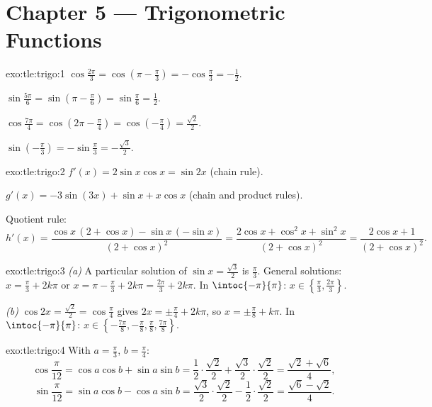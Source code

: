 \section*{Chapter 5 --- Trigonometric Functions}

\begin{solution}{exo:tle:trigo:1}
$\cos\frac{2\pi}{3} = \cos\left(\pi - \frac\pi3\right) = -\cos\frac\pi3
= -\frac12$.

$\sin\frac{5\pi}{6} = \sin\left(\pi - \frac\pi6\right) = \sin\frac\pi6
= \frac12$.

$\cos\frac{7\pi}{4} = \cos\left(2\pi - \frac{\pi}{4}\right)
= \cos\left(-\frac\pi4\right) = \frac{\sqrt2}{2}$.

$\sin\left(-\frac\pi3\right) = -\sin\frac\pi3 = -\frac{\sqrt3}{2}$.
\end{solution}

\begin{solution}{exo:tle:trigo:2}
$f'(x) = 2\sin x\cos x = \sin 2x$ (chain rule).

$g'(x) = -3\sin(3x) + \sin x + x\cos x$ (chain and product rules).

Quotient rule:
\[
h'(x) = \frac{\cos x\,(2 + \cos x) - \sin x\,(-\sin x)}{(2+\cos x)^2}
= \frac{2\cos x + \cos^2 x + \sin^2 x}{(2+\cos x)^2}
= \frac{2\cos x + 1}{(2+\cos x)^2}.
\]
\end{solution}

\begin{solution}{exo:tle:trigo:3}
\emph{(a)} A particular solution of $\sin x = \frac{\sqrt3}{2}$ is
$\frac\pi3$. General solutions: $x = \frac\pi3 + 2k\pi$ or
$x = \pi - \frac\pi3 + 2k\pi = \frac{2\pi}{3} + 2k\pi$. In
$\intoc{-\pi}{\pi}$: $x \in \left\{\frac\pi3, \frac{2\pi}{3}\right\}$.

\emph{(b)} $\cos 2x = \frac{\sqrt2}{2} = \cos\frac\pi4$ gives
$2x = \pm\frac\pi4 + 2k\pi$, so $x = \pm\frac\pi8 + k\pi$. In
$\intoc{-\pi}{\pi}$:
$x \in \left\{-\frac{7\pi}{8}, -\frac\pi8, \frac\pi8, \frac{7\pi}{8}\right\}$.
\end{solution}

\begin{solution}{exo:tle:trigo:4}
With $a = \frac\pi3$, $b = \frac\pi4$:
\[
\cos\frac{\pi}{12} = \cos a\cos b + \sin a \sin b
= \frac12\cdot\frac{\sqrt2}{2} + \frac{\sqrt3}{2}\cdot\frac{\sqrt2}{2}
= \frac{\sqrt2 + \sqrt6}{4},
\]
\[
\sin\frac{\pi}{12} = \sin a\cos b - \cos a \sin b
= \frac{\sqrt3}{2}\cdot\frac{\sqrt2}{2} - \frac12\cdot\frac{\sqrt2}{2}
= \frac{\sqrt6 - \sqrt2}{4}.
\]
\end{solution}

